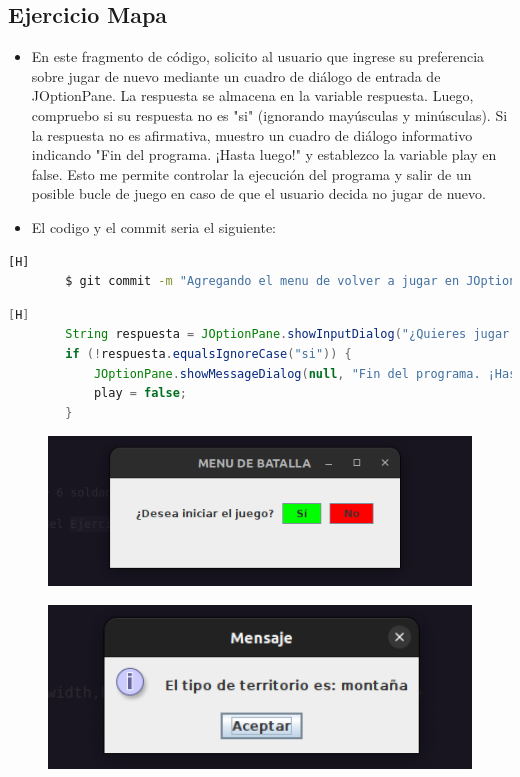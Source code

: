 \documentclass{article}
\begin{document}
	\subsection{Ejercicio Mapa}
	\begin{itemize}	
		\item En este fragmento de código, solicito al usuario que ingrese su preferencia sobre jugar de nuevo mediante un cuadro de diálogo de entrada de JOptionPane. La respuesta se almacena en la variable respuesta. Luego, compruebo si su respuesta no es "si" (ignorando mayúsculas y minúsculas). Si la respuesta no es afirmativa, muestro un cuadro de diálogo informativo indicando "Fin del programa. ¡Hasta luego!" y establezco la variable play en false. Esto me permite controlar la ejecución del programa y salir de un posible bucle de juego en caso de que el usuario decida no jugar de nuevo.
		\item El codigo y el commit seria el siguiente:
	\end{itemize}	
	\begin{lstlisting}[language=bash,caption={Commit}][H]
		$ git commit -m "Agregando el menu de volver a jugar en JOption el cual me permitira jugar denuevo o no en caso que no mi imprime un mensage"
	\end{lstlisting}	
	\begin{lstlisting}[language=java,caption={Las lineas de codigos de la clase Mapa}][H]
		String respuesta = JOptionPane.showInputDialog("¿Quieres jugar de nuevo? (si/no): ");
		if (!respuesta.equalsIgnoreCase("si")) {
			JOptionPane.showMessageDialog(null, "Fin del programa. ¡Hasta luego!");
			play = false;
		}
	\end{lstlisting}
	\begin{figure}[H]
		\centering
		\includegraphics[width=1.0\textwidth,keepaspectratio]{img/Commit11-1.png}
	\end{figure}
	\begin{figure}[H]
		\centering
		\includegraphics[width=1.0\textwidth,keepaspectratio]{img/Commit12-1.png}
	\end{figure}
\end{document}
